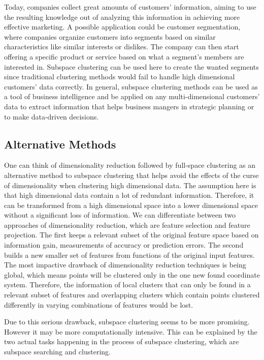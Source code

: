 Today, companies collect great amounts of customers’ information, aiming to use the resulting knowledge out of analyzing this information in achieving more effective marketing. A possible application could be customer segmentation, where companies organize customers into segments based on similar characteristics like similar interests or dislikes. The company can then start offering a specific product or service based on what a segment’s members are interested in. Subspace clustering can be used here to create the wanted segments since traditional clustering methods would fail to handle high dimensional customers’ data correctly.
In general, subspace clustering methods can be used as a tool of business intelligence and be applied on any multi-dimensional customers’ data to extract information that helps business mangers in strategic planning or to make data-driven decisions.

\subsection{Alternative Methods} One can think of dimensionality reduction followed by full-space clustering as an alternative method to subspace clustering that helps avoid the effects of the curse of dimensionality when clustering high dimensional data. The assumption here is that high dimensional data contain a lot of redundant information. Therefore, it can be transformed from a high dimensional space into a lower dimensional space without a significant loss of information. We can differentiate between two approaches of dimensionality reduction, which are feature selection and feature projection. The first keeps a relevant subset of the original feature space based on information gain, measurements of accuracy or prediction errors. The second builds a new smaller set of features from functions of the original input features. The  most impactive drawback of dimensionality reduction techniques is being global, which means points will be clustered only in the one new found coordinate system. Therefore, the information of local clusters that can only be found in a relevant subset of features and overlapping clusters which contain points clustered differently in varying combinations of features would be lost. 

Due to this serious drawback, subspace clustering seems to be more promising. However it may be more computationally intensive. This can be explained by the two actual tasks happening in the process of subspace clustering, which are subspace searching and clustering.
 

